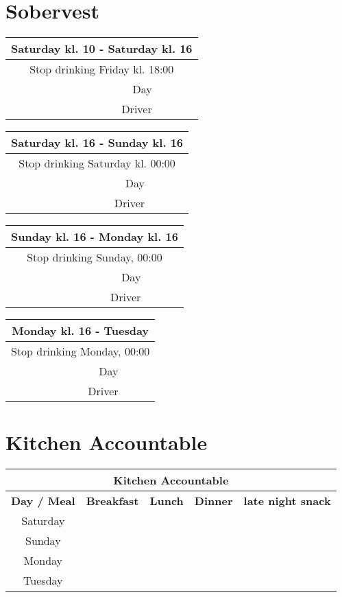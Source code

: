 \documentclass[../../main.tex]{subfiles}
\begin{document}
\section{Sobervest}
\begin{center}
\begin{tabularx}{0.5\textwidth}{|r|X|}
\hline \multicolumn{2}{|c|}{\textbf{Saturday kl. 10 - Saturday kl. 16}} \\
\hline \multicolumn{2}{|c|}{Stop drinking Friday kl. 18:00} \\
\hline\hline Day &  \\
\hline Driver &  \\
\hline
\end{tabularx}

\begin{tabularx}{0.5\textwidth}{|r|X|}
\hline \multicolumn{2}{|c|}{\textbf{Saturday kl. 16 - Sunday kl. 16}} \\
\hline \multicolumn{2}{|c|}{Stop drinking Saturday kl. 00:00} \\
\hline\hline Day &  \\
\hline Driver &  \\
\hline
\end{tabularx}

\begin{tabularx}{0.5\textwidth}{|r|X|}
\hline \multicolumn{2}{|c|}{\textbf{Sunday kl. 16 - Monday kl. 16}} \\
\hline \multicolumn{2}{|c|}{Stop drinking Sunday, 00:00} \\
\hline\hline Day &  \\
\hline Driver &  \\
\hline
\end{tabularx}

\begin{tabularx}{0.5\textwidth}{|r|X|}
\hline \multicolumn{2}{|c|}{\textbf{Monday kl. 16 - Tuesday}} \\
\hline \multicolumn{2}{|c|}{Stop drinking Monday, 00:00} \\
\hline\hline Day &  \\
\hline Driver &  \\
\hline
\end{tabularx}
\end{center}

\section{Kitchen Accountable}
\begin{center}
\begin{tabularx}{0.78\textwidth}{|c|X|X|X|X|}
\hline \multicolumn{5}{|c|}{\textbf{Kitchen Accountable}} \\
\hline \textbf{Day / Meal} & \textbf{Breakfast} & \textbf{Lunch} & \textbf{Dinner} & \textbf{late night snack} \\
\hline
\hline Saturday   &  &  &  &  \\
\hline Sunday     &  &  &  &  \\
\hline Monday     &  &  &  &  \\
\hline Tuesday    &  &  &  &  \\
\hline
\end{tabularx}
\end{center}
\end{document}

